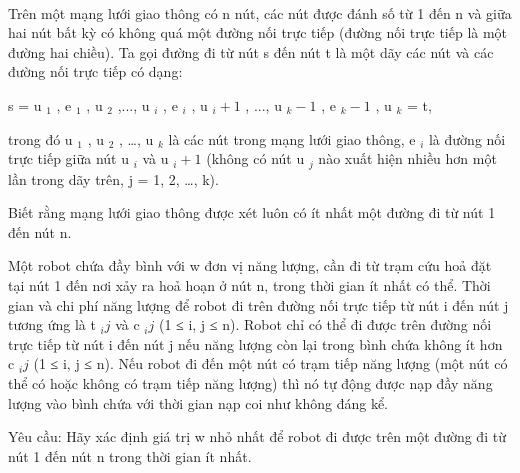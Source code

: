  

Trên một mạng lưới giao thông có n nút, các nút được đánh số từ 1 đến n và giữa hai nút bất kỳ có không quá một đường nối trực tiếp (đường nối trực tiếp là một đường hai chiều). Ta gọi đường đi từ nút s đến nút t là một dãy các nút và các đường nối trực tiếp có dạng:

s = u $_ 1 $ , e $_ 1 $ , u $_ 2 $ ,..., u $_ i $ , e $_ i $ , u $_ i+1 $ , ..., u $_ k-1 $ , e $_ k-1 $ , u $_ k $ = t,

trong đó u $_ 1 $ , u $_ 2 $ , …, u $_ k $ là các nút trong mạng lưới giao thông, e $_ i $ là đường nối trực tiếp giữa nút u $_ i $ và u $_ i+1 $ (không có nút u $_ j $ nào xuất hiện nhiều hơn một lần trong dãy trên, j = 1, 2, …, k).

Biết rằng mạng lưới giao thông được xét luôn có ít nhất một đường đi từ nút 1 đến nút n.

Một robot chứa đầy bình với w đơn vị năng lượng, cần đi từ trạm cứu hoả đặt tại nút 1 đến nơi xảy ra hoả hoạn ở nút n, trong thời gian ít nhất có thể. Thời gian và chi phí năng lượng để robot đi trên đường nối trực tiếp từ nút i đến nút j tương ứng là t $_ ij $ và c $_ ij $ (1 ≤ i, j ≤ n). Robot chỉ có thể đi được trên đường nối trực tiếp từ nút i đến nút j nếu năng lượng còn lại trong bình chứa không ít hơn c $_ ij $ (1 ≤ i, j ≤ n). Nếu robot đi đến một nút có trạm tiếp năng lượng (một nút có thể có hoặc không có trạm tiếp năng lượng) thì nó tự động được nạp đầy năng lượng vào bình chứa với thời gian nạp coi như không đáng kể.

Yêu cầu: Hãy xác định giá trị w nhỏ nhất để robot đi được trên một đường đi từ nút 1 đến nút n trong thời gian ít nhất.

\